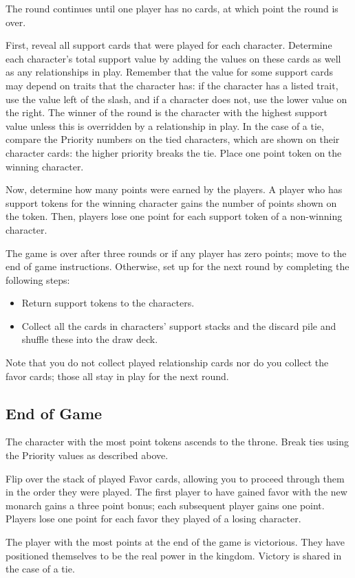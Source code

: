 \documentclass{article}
\begin{document}
The round continues until one player has no cards, at which point
the round is over.

First, reveal all support cards that were played for each character.
Determine each character's total support value by adding the
values on these cards as well as any relationships in play.
Remember that the value for some support cards may depend on
traits that the character has: if the character has a listed trait,
use the value left of the slash, and if a character does not, use
the lower value on the right.
The winner of the round is the character with the highest support
value unless this is overridden by a relationship in play.
In the case of a tie, compare the Priority numbers on the
tied characters, which are shown on their character cards:
the higher priority breaks the tie.
Place one point token on the winning character.

Now, determine how many points were earned by the players.
A player who has support tokens for the winning character
gains the number of points shown on the token. Then, players
lose one point for each support token of a non-winning character.

The game is over after three rounds or if any player has
zero points; move to the end of game instructions.
Otherwise, set up for the next round by completing the following steps:
\begin{itemize}
\item Return support tokens to the characters.
\item Collect all the cards in characters' support stacks and the
  discard pile and shuffle these into the draw deck.
\end{itemize}

Note that you do not collect played relationship cards nor do you
collect the favor cards; those all stay in play for the next round.

\subsection*{End of Game}

The character with the most point tokens ascends to the throne.
Break ties using the Priority values as described above.

Flip over the stack of played Favor cards, allowing you to proceed
through them in the order they were played.  The first player to have
gained favor with the new monarch gains a three point bonus; each
subsequent player gains one point.  Players lose one point for each
favor they played of a losing character.

The player with the most points at the end of the game is victorious.
They have positioned themselves to be the real power in the kingdom.
Victory is shared in the case of a tie.
\end{document}
